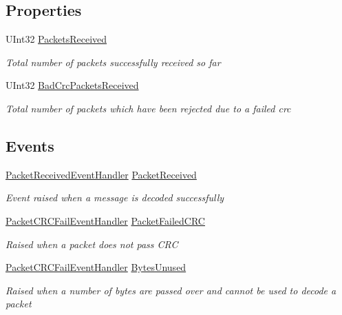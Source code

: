 \subsection*{Properties}
\begin{DoxyCompactItemize}
\item 
U\+Int32 \hyperlink{classMavLink_1_1Mavlink_a5fb529a26ee8250d83fac7a1be30a041}{Packets\+Received}
\begin{DoxyCompactList}\small\item\em Total number of packets successfully received so far \end{DoxyCompactList}\item 
U\+Int32 \hyperlink{classMavLink_1_1Mavlink_a85571c31a47c311ac883279e8dcd02c9}{Bad\+Crc\+Packets\+Received}
\begin{DoxyCompactList}\small\item\em Total number of packets which have been rejected due to a failed crc \end{DoxyCompactList}\end{DoxyCompactItemize}
\subsection*{Events}
\begin{DoxyCompactItemize}
\item 
\hyperlink{namespaceMavLink_a78c17c9f049257b0626c8d377735666d}{Packet\+Received\+Event\+Handler} \hyperlink{classMavLink_1_1Mavlink_ae5657dc889b9cbc7ce2c03d1cd5f7e73}{Packet\+Received}
\begin{DoxyCompactList}\small\item\em Event raised when a message is decoded successfully \end{DoxyCompactList}\item 
\hyperlink{namespaceMavLink_a8ed8a6701876b63e5bb9135a9897d679}{Packet\+C\+R\+C\+Fail\+Event\+Handler} \hyperlink{classMavLink_1_1Mavlink_ac73a6b5c5f3ecd09964ec630225fabdd}{Packet\+Failed\+C\+RC}
\begin{DoxyCompactList}\small\item\em Raised when a packet does not pass C\+RC \end{DoxyCompactList}\item 
\hyperlink{namespaceMavLink_a8ed8a6701876b63e5bb9135a9897d679}{Packet\+C\+R\+C\+Fail\+Event\+Handler} \hyperlink{classMavLink_1_1Mavlink_a88f743816b644b0d36b05c188a452fab}{Bytes\+Unused}
\begin{DoxyCompactList}\small\item\em Raised when a number of bytes are passed over and cannot be used to decode a packet \end{DoxyCompactList}\end{DoxyCompactItemize}


